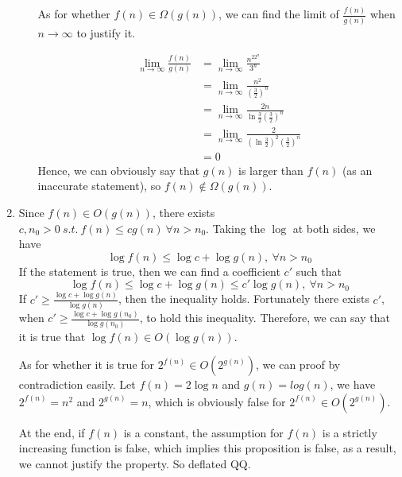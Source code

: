 \documentclass[a4paper,12pt]{article}
\begin{document}
\begin{enumerate}
\begin{enumerate}
{As for whether $f(n) \in \Omega (g(n))$, we can find the limit of $\frac{f(n)}{g(n)}$ when $n \rightarrow \infty $ to justify it.

\[
\begin{split}
\lim_{n \rightarrow \infty} \frac{f(n)}{g(n)} & = \lim_{n \rightarrow \infty} \frac{n^22^n}{3^n} \\
& = \lim_{n \rightarrow \infty} \frac{n^2}{(\frac{3}{2})^n} \\
& = \lim_{n \rightarrow \infty} \frac{2n}{\ln \frac{3}{2} (\frac{3}{2})^n} \\
& = \lim_{n \rightarrow \infty} \frac{2}{(\ln \frac{3}{2})^2 (\frac{3}{2})^n} \\
& = 0
\end{split}
\]
Hence, we can obviously say that $g(n)$ is larger than $f(n)$ (as an inaccurate statement), so $f(n) \notin \Omega (g(n))$.
    }
\end{enumerate}

\item{
Since $f(n) \in O(g(n))$, there exists $c,n_0>0 \ s.t. \ f(n) \leq cg(n) \ \forall n>n_0$. Taking the $\log$ at both sides, we have
\[
\log f(n) \leq \log c + \log g(n), \ \forall n>n_0
\]
If the statement is true, then we can find a coefficient $c'$ such that
\[
\log f(n) \leq \log c + \log g(n) \leq c' \log g(n), \ \forall n>n_0
\]
If $c' \geq \frac{\log c + \log g(n)}{\log g(n)}$, then the inequality holds. Fortunately there exists $c'$, when $c' \geq \frac{\log c + \log g(n_0)}{\log g(n_0)}$, to hold this inequality. Therefore, we can say that it is true that $\log f(n) \in O(\log g(n))$.

As for whether it is true for $2^{f(n)} \in O(2^{g(n)})$, we can proof by contradiction easily. Let $f(n) = 2\log n$ and $g(n) = log(n)$, we have $2^{f(n)}=n^2$ and $2^{g(n)} = n$, which is obviously false for $2^{f(n)} \in O(2^{g(n)})$.

At the end, if $f(n)$ is a constant, the assumption for $f(n)$ is a strictly increasing function is false, which implies this proposition is false, as a result, we cannot justify the property. So deflated QQ.
}


\end{enumerate}
\end{document}

